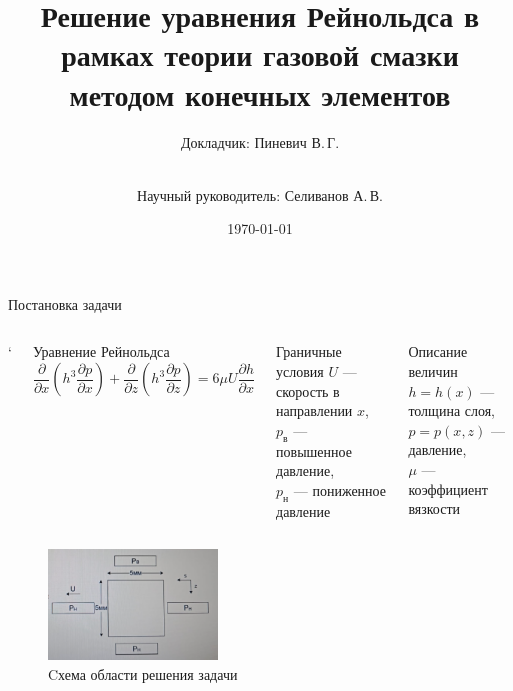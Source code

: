 \documentclass[ignoreonframetext,unicode]{beamer}
\title[Решение уравнения Рейнольдса]{Решение уравнения Рейнольдса в рамках теории газовой смазки методом конечных элементов}
\author[Пиневич В.\,Г.]{Докладчик: Пиневич В.\,Г.\and\\[0.5mm] Научный руководитель: Селиванов А.\,В.}
\institute[каф. Прикладная математика ФН-2]{группа ФН2-71Б}
\date{\today}
\begin{document}
	
	\begin{frame}[plain]
		\maketitle
	\end{frame}

	\begin{frame}{Постановка задачи}
		\vspace*{-4mm}
		\begin{columns}
			\column{\textwidth}`
			\begin{block}{Уравнение Рейнольдса}
			 \[
				\frac{\partial}{\partial x} \left(h^3 \frac{\partial p}{\partial x} \right) + \frac{\partial}{\partial z} \left(h^3 \frac{\partial p}{\partial z} \right) = 6 \mu U \frac{\partial h}{\partial x}
			 \]
			\end{block}

\vspace*{-2mm}
		\begin{columns}
			\begin{block}{Граничные условия}
				$U$ --- скорость в направлении $x$,\\ 
				$p_{\text{в}}$ --- повышенное давление,\\ 
				$p_{\text{н}}$ --- пониженное давление
			\end{block}
		
			\begin{block}{Описание величин}
			$h = h(x)$ --- толщина слоя, \\
			$p = p(x, z)$ --- давление, \\
			$\mu$ --- коэффициент вязкости
			\end{block}
		\end{columns}

		\end{columns}
		
		\begin{figure}[!htbp]
			\centering
			\includegraphics[width=0.4\textwidth]{taskGU}%
			\caption{Cхема области решения задачи}
			\vspace*{-2mm}
			\label{ser_graph}
		\end{figure}
		
	\end{frame}
\end{document}
